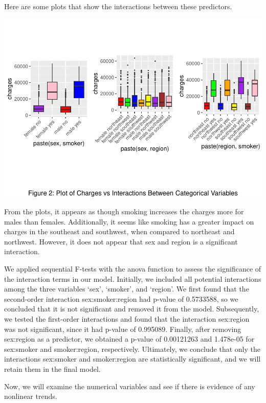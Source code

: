 \documentclass[
  12pt,
]{article}
\begin{document}
Here are some plots that show the interactions between these predictors.

\includegraphics{finalproject_files/figure-latex/unnamed-chunk-11-1.pdf}

From the plots, it appears as though smoking increases the charges more
for males than females. Additionally, it seems like smoking has a
greater impact on charges in the southeast and southwest, when compared
to northeast and northwest. However, it does not appear that sex and
region is a significant interaction.

We applied sequential F-tests with the anova function to assess the
significance of the interaction terms in our model. Initially, we
included all potential interactions among the three variables `sex',
`smoker', and `region'. We first found that the second-order interaction
sex:smoker:region had p-value of 0.5733588, so we concluded that it is
not significant and removed it from the model. Subsequently, we tested
the first-order interactions and found that the interaction sex:region
was not significant, since it had p-value of 0.995089. Finally, after
removing sex:region as a predictor, we obtained a p-value of 0.00121263
and 1.478e-05 for sex:smoker and smoker:region, respectively.
Ultimately, we conclude that only the interactions sex:smoker and
smoker:region are statistically significant, and we will retain them in
the final model.

Now, we will examine the numerical variables and see if there is
evidence of any nonlinear trends.
\end{document}
